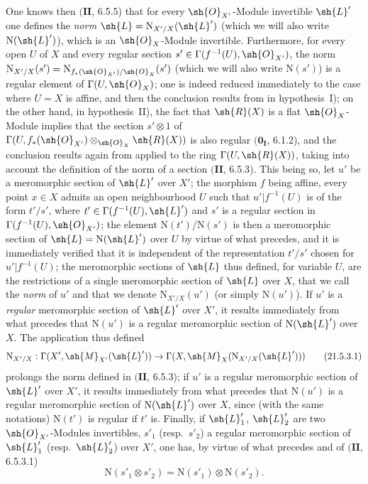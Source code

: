 \begin{env}[21.5.3]
One knows then $(\mathbf{II}$, 6.5.5) that for every $\sh{O}_{X'}$-Module invertible $\sh{L}'$ one defines the \emph{norm} $\sh{L}=\mathrm{N}_{X'/X}(\sh{L}')$ (which we will also write $\mathrm{N}(\sh{L}')$), which is an $\sh{O}_X$-Module invertible.
Furthermore, for every open $U$ of $X$ and every regular section $s'\in\Gamma(f^{-1}(U),\sh{O}_{X'})$, the norm $\mathrm{N}_{X'/X}(s')=\mathrm{N}_{f_*(\sh{O}_{X'})/\sh{O}_X}(s')$ (which we will also write $\mathrm{N}(s')$) is a regular element of $\Gamma(U,\sh{O}_X)$;
one is indeed reduced immediately to the case where $U=X$ is affine, and then the conclusion results from  in hypothesis~I);
on the other hand, in hypothesis~II), the fact that $\sh{R}(X)$ is a flat $\sh{O}_X$-Module implies that the section $s'\otimes 1$ of $\Gamma(U,f_*(\sh{O}_{X'})\otimes_{\sh{O}_X}\sh{R}(X))$ is also regular $(\mathbf{0_I}$, 6.1.2), and the conclusion results again from  applied to the ring $\Gamma(U,\sh{R}(X))$, taking into account the definition of the norm of a section $(\mathbf{II}$, 6.5.3).
This being so, let $u'$ be a meromorphic section of $\sh{L}'$ over $X'$;
the morphism $f$ being affine, every point $x\in X$ admits an open neighbourhood $U$ such that $u'|f^{-1}(U)$ is of the form $t'/s'$, where $t'\in\Gamma(f^{-1}(U),\sh{L}')$ and $s'$ is a regular section in $\Gamma(f^{-1}(U),\sh{O}_{X'})$;
the element $\mathrm{N}(t')/\mathrm{N}(s')$ is then a meromorphic section of $\sh{L}=\mathrm{N}(\sh{L}')$ over $U$ by virtue of what precedes, and it is immediately verified that it is independent of the representation $t'/s'$ chosen for $u'|f^{-1}(U)$;
the meromorphic sections of $\sh{L}$ thus defined, for variable $U$, are the restrictions of a single meromorphic section of $\sh{L}$ over $X$, that we call the \emph{norm} of $u'$ and that we denote $\mathrm{N}_{X'/X}(u')$ (or simply $\mathrm{N}(u')$).
If $u'$ is a \emph{regular} meromorphic section of $\sh{L}'$ over $X'$, it results immediately from what precedes that $\mathrm{N}(u')$ is a regular meromorphic section of $\mathrm{N}(\sh{L}')$ over $X$.
The application thus defined
\[
\label{IV.21.5.3.1}
  \mathrm{N}_{X'/X}:\Gamma(X',\sh{M}_{X'}(\sh{L}'))\to\Gamma(X,\sh{M}_X(\mathrm{N}_{X'/X}(\sh{L}')))
  \tag{21.5.3.1}
\]
prolongs the norm defined in $(\mathbf{II}$, 6.5.3);
if $u'$ is a regular meromorphic section of $\sh{L}'$ over $X'$, it results immediately from what precedes that $\mathrm{N}(u')$ is a regular meromorphic section of $\mathrm{N}(\sh{L}')$ over $X$, since (with the same notations) $\mathrm{N}(t')$ is regular if $t'$ is.
Finally, if $\sh{L}'_1$, $\sh{L}'_2$ are two $\sh{O}_{X'}$-Modules invertibles, $s'_1$ (resp.\ $s'_2$) a regular meromorphic section of $\sh{L}'_1$ (resp.\ $\sh{L}'_2$) over $X'$, one has, by virtue of what precedes and of $(\mathbf{II}$, 6.5.3.1)
\[
\label{IV.21.5.3.2}
  \mathrm{N}(s'_1\otimes s'_2)=\mathrm{N}(s'_1)\otimes\mathrm{N}(s'_2).
  \tag{21.5.3.2}
\]
\end{env}

